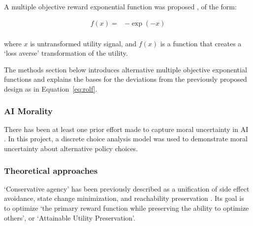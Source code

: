 A multiple objective reward exponential function was proposed \cite{rolf_need_2020}, of the form:

\begin{align}\label{eq:rolf}
f(x)= &  -\exp(-x) \\ \nonumber
\end{align}

 where $x$ is untransformed utility signal, and $f(x)$ is a function that creates a `loss averse' transformation of the utility.

The methods section below introduces alternative multiple objective exponential functions and explains the bases for the deviations from the previously proposed \cite{rolf_need_2020} design as in Equation~\ref{eq:rolf}.

\subsubsection{AI Morality}

There has been at least one prior effort made to capture moral uncertainty in AI \cite{martinho_empirical_2020}. In this project, a discrete choice analysis model was used to demonstrate moral uncertainty about alternative policy choices.



\subsubsection{Theoretical approaches}


`Conservative agency' has been previously described as a unification of side effect avoidance, state change minimization, and reachability preservation \cite{armstrong_low_2017, turner_conservative_2020}. Its goal is to optimize `the primary reward function while preserving the ability to optimize others', or `Attainable Utility Preservation'.

